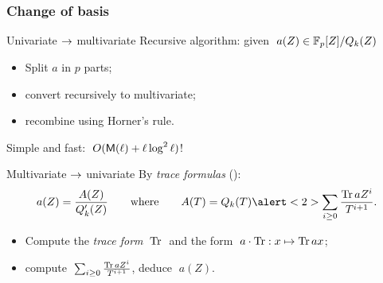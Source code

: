 \documentclass[10pt,usepdftitle=false]{beamer}
\begin{document}

\begin{frame}
  \frametitle{Change of basis}

  \begin{block}{Univariate $\rightarrow$ multivariate}
    Recursive algorithm: given $\;a(Z)\in\mathbb{F}_p[Z]/Q_k(Z)$
    \begin{itemize}
    \item Split $a$ in $p$ parts;
    \item convert recursively to multivariate;
    \item recombine using Horner's rule.
    \end{itemize}
    Simple and fast: \emph{$\;O(\mathsf{M}(\ell) + \ell\log^2\ell)$}!
  \end{block}

  \begin{block}{Multivariate $\rightarrow$ univariate}
    By \textit{trace formulas} (\cite{rouiller99}):
      \[
      a(Z) = \frac{A(Z)}{Q_k'(Z)}
      \qquad\text{where}\qquad
      A(T) = Q_k(T)\alert<2>{\sum_{i\ge 0}\frac{\Tr aZ^i}{T^{i+1}}}
      \text{.}\]
    \begin{itemize}
    \item Compute the \textit{trace form} $\;\operatorname{Tr}\;$ and the form
      $\;a\cdot\operatorname{Tr} : x\mapsto \operatorname{Tr} ax$;
    \item \alert<2>{compute $\;\sum_{i\ge 0}\frac{\operatorname{Tr} aZ^i}{T^{i+1}}$}, deduce $\;a(Z)$.
    \end{itemize}
  \end{block}
\end{frame}

\end{document}
